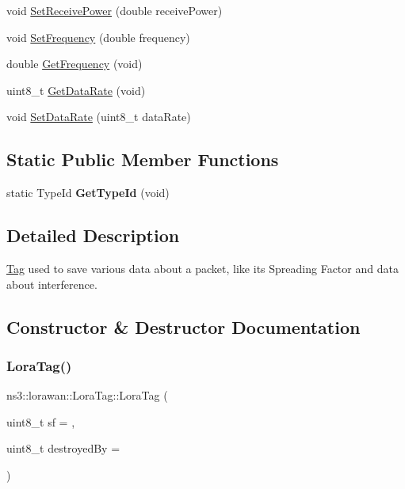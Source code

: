 \begin{DoxyCompactItemize}
\item 
void \hyperlink{classns3_1_1lorawan_1_1LoraTag_ac13d46d936c4da9814ab6fb113f9fc64}{Set\+Receive\+Power} (double receive\+Power)
\item 
void \hyperlink{classns3_1_1lorawan_1_1LoraTag_a9c6da5747bb782ee78f0edd91775ab1b}{Set\+Frequency} (double frequency)
\item 
double \hyperlink{classns3_1_1lorawan_1_1LoraTag_adb07fb2ac91bec8d81426ece513ed062}{Get\+Frequency} (void)
\item 
uint8\+\_\+t \hyperlink{classns3_1_1lorawan_1_1LoraTag_a23f8237d7bf360dc2a24496c904cbaab}{Get\+Data\+Rate} (void)
\item 
void \hyperlink{classns3_1_1lorawan_1_1LoraTag_a539be1f167fb209d8e3105dc99779c88}{Set\+Data\+Rate} (uint8\+\_\+t data\+Rate)
\end{DoxyCompactItemize}
\subsection*{Static Public Member Functions}
\begin{DoxyCompactItemize}
\item 
\mbox{\label{classns3_1_1lorawan_1_1LoraTag_a03dd31c3014ed944df5f024544a13bd9}} 
static Type\+Id {\bfseries Get\+Type\+Id} (void)
\end{DoxyCompactItemize}


\subsection{Detailed Description}
\hyperlink{classTag}{Tag} used to save various data about a packet, like its Spreading Factor and data about interference. 

\subsection{Constructor \& Destructor Documentation}
\mbox{\label{classns3_1_1lorawan_1_1LoraTag_ab431ca942a24ff3f58edca2ca790a525}} 
\subsubsection{\texorpdfstring{Lora\+Tag()}{LoraTag()}}
{\footnotesize\ttfamily ns3\+::lorawan\+::\+Lora\+Tag\+::\+Lora\+Tag (\begin{DoxyParamCaption}\item[{uint8\+\_\+t}]{sf = {},  }\item[{uint8\+\_\+t}]{destroyed\+By = {} }\end{DoxyParamCaption})}

